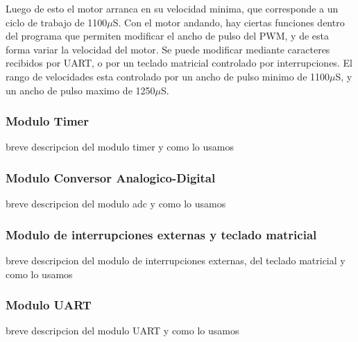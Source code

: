 \documentclass[a4paper]{article}
\begin{document}
Luego de esto el motor arranca en su velocidad minima, que corresponde a un ciclo de trabajo de 1100$\mu$S. Con el motor andando, hay ciertas funciones dentro del programa que permiten modificar el ancho de pulso del PWM, y de esta forma variar la velocidad del motor. Se puede modificar mediante caracteres recibidos por UART, o por un teclado matricial controlado por interrupciones. El rango de velocidades esta controlado por un ancho de pulso minimo de 1100$\mu$S, y un ancho de pulso maximo de 1250$\mu$S.
  


\subsubsection{Modulo Timer} %
\label{ssub:modulo_timer}

breve descripcion del modulo timer y como lo usamos


\subsubsection{Modulo Conversor Analogico-Digital} %
\label{ssub:modulo_conversor_analogico_digital}

breve descripcion del modulo adc y como lo usamos


\subsubsection{Modulo de interrupciones externas y teclado matricial} %
\label{ssub:modulo_de_interrupciones_externas_y_teclado_matricial}

breve descripcion del modulo de interrupciones externas, del teclado matricial y como lo usamos


\subsubsection{Modulo UART} %
\label{ssub:modulo_uart}

breve descripcion del modulo UART y como lo usamos


\end{document}
